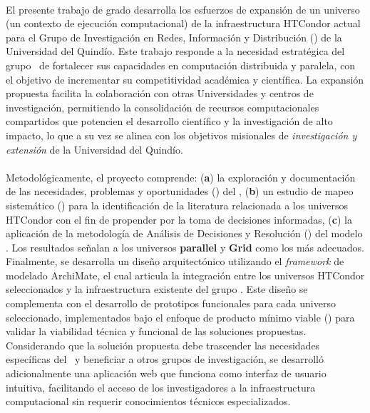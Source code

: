 \label{cap:resumen}
\mbox{}\\
\noindent
El presente trabajo de grado desarrolla los esfuerzos de expansión de un universo (\ie un contexto de ejecución computacional) de la infraestructura HTCondor actual para el Grupo de Investigación en Redes, Información y Distribución (\GRID) de la Universidad del Quindío. Este trabajo responde a la necesidad estratégica del grupo \GRID~de fortalecer sus capacidades en computación distribuida y paralela, con el objetivo de incrementar su competitividad académica y científica. La expansión propuesta facilita la colaboración con otras Universidades y centros de investigación, permitiendo la consolidación de recursos computacionales compartidos que potencien el desarrollo científico y la investigación de alto impacto, lo que a su vez se alinea con los objetivos misionales de \textit{investigación y extensión} de la Universidad del Quindío.
\\\\
Metodológicamente, el proyecto comprende: (\textbf{a}) la exploración y documentación de las necesidades, problemas y oportunidades (\NPO) del \GRID, (\textbf{b}) un estudio de mapeo sistemático (\SMS) para la identificación de la literatura relacionada a los universos HTCondor con el fin de propender por la toma de decisiones informadas, (\textbf{c}) la aplicación de la metodología de Análisis de Decisiones y Resolución (\DAR) del modelo \CMMI. Los resultados señalan a los universos \textbf{parallel} y \textbf{Grid} como los más adecuados. Finalmente, se desarrolla un diseño arquitectónico utilizando el \textit{framework } de modelado ArchiMate, el cual articula la integración entre los universos HTCondor seleccionados y la infraestructura existente del grupo \GRID. Este diseño se complementa con el desarrollo de prototipos funcionales para cada universo seleccionado, implementados bajo el enfoque de producto mínimo viable (\PMV) para validar la viabilidad técnica y funcional de las soluciones propuestas. Considerando que la solución propuesta debe trascender las necesidades específicas del \GRID~y beneficiar a otros grupos de investigación, se desarrolló adicionalmente una aplicación web que funciona como interfaz de usuario intuitiva, facilitando el acceso de los investigadores a la infraestructura computacional sin requerir conocimientos técnicos especializados.






